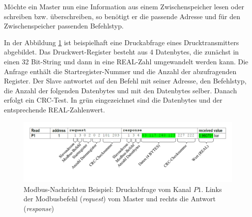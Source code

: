  Möchte ein Master nun eine Information aus einem Zwischenspeicher lesen oder schreiben bzw. überschreiben, so benötigt er die passende Adresse und für den Zwischenspeicher passenden Befehlstyp.

In der Abbildung \ref{fig:ModbusNachrichtBeispiel} ist beispielhaft eine Druckabfrage eines Drucktransmitters abgebildet. Das Druckwert-Register besteht aus 4 Datenbytes, die zunächst in einen 32 Bit-String und dann in eine REAL-Zahl umgewandelt werden kann. 
Die Anfrage enthält die Startregister-Nummer und die Anzahl der abzufragenden Register. 
Der Slave antwortet auf den Befehl  mit seiner Adresse, den Befehlstyp, die Anzahl der folgenden Datenbytes und mit den Datenbytes selber. Danach erfolgt ein CRC-Test. In grün eingezeichnet sind die Datenbytes und der entsprechende REAL-Zahlenwert. 

\begin{figure}[htb]
\centering		\includegraphics[width=1.0\textwidth]{Pictures/Versuchsaufbau/ModbusBefehlBeispiel.pdf}
\caption{Modbus-Nachrichten Beispiel: Druckabfrage vom Kanal $P1$. Links der Modbusbefehl (\textit{request}) vom Master und rechts die Antwort (\textit{response})}
\label{fig:ModbusNachrichtBeispiel}
\end{figure}



